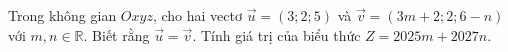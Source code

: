 \begin{ex}
Trong không gian $Oxyz$, cho hai vectơ $\vec u=(3;2;5)$ và $\vec v=(3m+2;2;6-n)$ với $m,n\in\mathbb R$. Biết rằng $\vec u=\vec v$. Tính giá trị của biểu thức $Z=2025m+2027n$.
\end{ex}
